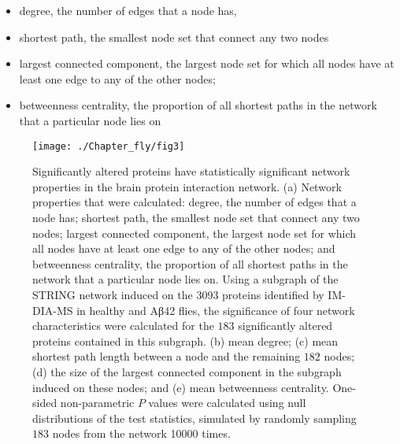 \begin{itemize}
    \item degree, the number of edges that a node has,
    \item shortest path, the smallest node set that connect any two nodes
    \item largest connected component, the largest node set for which all nodes have at least one edge to any of the other nodes;
    \item betweenness centrality, the proportion of all shortest paths in the network that a particular node lies on
\end{itemize}


\begin{figure}[!hbt]
    \centering
    \texttt{[image: ./Chapter\_fly/fig3]}
    \caption{%
        Significantly altered proteins have statistically significant network properties
        in the brain protein interaction network.
        (a) Network properties that were calculated:
        degree, the number of edges that a node has;
        shortest path, the smallest node set that connect any two nodes;
        largest connected component, the largest node set for which all nodes have at least
        one edge to any of the other nodes;
        and betweenness centrality, the proportion of all shortest paths in the network
        that a particular node lies on.
        Using a subgraph of the STRING network induced on the \num{3093} proteins identified by
        IM-DIA-MS in healthy and Aβ42 flies, the significance of four network
        characteristics were calculated for the $183$ significantly altered proteins
        contained in this subgraph.
        (b) mean degree;
        (c) mean shortest path length between a node and the remaining $182$ nodes;
        (d) the size of the largest connected component in the subgraph induced on these nodes;
        and (e) mean betweenness centrality.
        One-sided non-parametric $P$ values were calculated using null distributions of the
        test statistics, simulated by randomly sampling $183$ nodes from the network \num{10000} times.
    }
    \label{fig:fly-fig3}
\end{figure}

